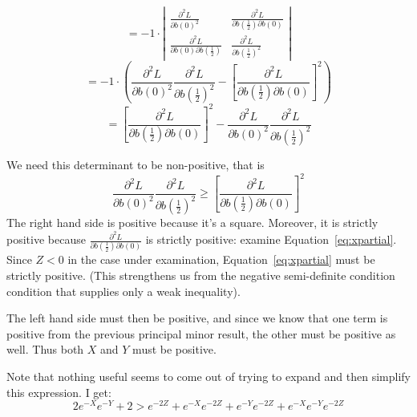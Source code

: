\documentclass[12pt]{article}
\begin{document}
\begin{itemize}
\[		\]
		\[
		  = - 1 \cdot \left|\begin{array}{cc}
			\frac{\partial^2 L}{\partial b(0)^2} & \frac{\partial^2 L}{\partial b\left(\frac{1}{2}\right)\partial b\left(0\right)} \\
			\frac{\partial^2 L}{\partial b(0) \partial b\left(\frac{1}{2}\right)} & \frac{\partial^2 L}{\partial b\left(\frac{1}{2}\right)^2}
			\end{array} \right|
		\]
		\[
		  = - 1 \cdot \left(
			\frac{\partial^2 L}{\partial b(0)^2} \frac{\partial^2 L}{\partial b\left(\frac{1}{2}\right)^2} - \left[\frac{\partial^2 L}{\partial b\left(\frac{1}{2}\right)\partial b\left(0\right)}\right]^2 \right)
		\]
		\[
		  = \left[\frac{\partial^2 L}{\partial b\left(\frac{1}{2}\right)\partial b\left(0\right)}\right]^2 - \frac{\partial^2 L}{\partial b(0)^2} \frac{\partial^2 L}{\partial b\left(\frac{1}{2}\right)^2}
		\]

  We need this determinant to be non-positive, that is
		\[
		  \frac{\partial^2 L}{\partial b(0)^2} \frac{\partial^2 L}{\partial b\left(\frac{1}{2}\right)^2} \geq \left[\frac{\partial^2 L}{\partial b\left(\frac{1}{2}\right)\partial b\left(0\right)}\right]^2 
		\]
	  The right hand side is positive because it's a square. Moreover, it is strictly positive because $\frac{\partial^2 L}{\partial b\left(\frac{1}{2}\right)\partial b\left(0\right)}$ is strictly positive: examine Equation~\ref{eq:xpartial}. Since $Z < 0$ in the case under examination, Equation~\ref{eq:xpartial} must be strictly positive. (This strengthens us from the negative semi-definite condition condition that supplies only a weak inequality).
		
		The left hand side must then be positive, and since we know that one term is positive from the previous principal minor result, the other must be positive as well. Thus both $X$ and $Y$ must be positive.
\end{itemize}
Note that nothing useful seems to come out of trying to expand and then simplify this expression. I get:
\[
  2e^{-X}e^{-Y} + 2 > e^{-2Z} + e^{-X}e^{-2Z} + e^{-Y}e^{-2Z} + e^{-X}e^{-Y}e^{-2Z}
\]		

\newpage
\end{document}
